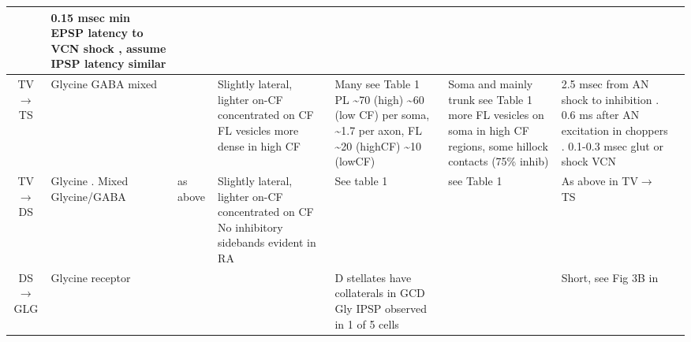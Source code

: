 \begin{longtable}{cXXXXXXX}
& 
0.15 msec min EPSP latency to VCN shock , assume IPSP latency similar
\citep{ZhangOertel:1993}\\ \midrule
TV\ensuremath{\rightarrow}TS                        
& %
Glycine\citep{OertelWickesberg:1993,OstapoffMorestEtAl:1999,SaintBensonEtAl:1991,WickesbergOertel:1993}
                GABA mixed \citep{OsenOttersenEtAl:1990}                  
& %
   \citep{HartyManis:1998,OertelWickesberg:1993,WickesbergOertel:1993}    
& %
Slightly lateral, lighter on-CF \citep{OstapoffMorestEtAl:1999} concentrated
on CF \citep{ZhangOertel:1993} FL vesicles more dense in high CF
                      \citep{JosephsonMorest:1998}                        
& %
Many \citep{OstapoffMorestEtAl:1999} see
Table 1 \citep{SmithRhode:1989} PL \~{}70 (high) \~{}60 (low CF) per soma,
\~{}1.7 per axon, FL \~{}20 (highCF) \~{}10 (lowCF)
                      \citep{JosephsonMorest:1998}                        
& %
Soma and mainly trunk
\citep{AltschulerJuizEtAl:1993} 
see Table 1\citep{SmithRhode:1989} 
more FL vesicles on soma in high CF regions, some hillock contacts (75\% inhib) \citep{JosephsonMorest:1998}                        
& %
2.5 msec from AN shock to inhibition \citep{WickesbergOertel:1993}. 
0.6 ms after AN excitation in choppers \citep{Wickesberg:1996}. 
0.1-0.3 msec glut or shock VCN \citep{ZhangOertel:1993}
\\ \midrule
TV\ensuremath{\rightarrow}DS                        
&  %
Glycine \citep{OstapoffMorestEtAl:1999,SaintBensonEtAl:1991}. 
Mixed  Glycine/GABA \citep{OsenOttersenEtAl:1990}                 
& %
\citep{OstapoffMorestEtAl:1999}
                                as above                                  
& Slightly lateral, lighter on-CF \citep{OstapoffMorestEtAl:1999}
concentrated on CF \citep{ZhangOertel:1993} No inhibitory sidebands evident in RA                                   
&    See table 1 \citep{SmithRhode:1989}     
& see Table 1 \citep{SmithRhode:1989}                          
& 
As above in TV\ensuremath{\rightarrow}TS
\\ \midrule
DS\ensuremath{\rightarrow}GLG                                 
&                  
Glycine receptor                  
&  %
& 
& D stellates have collaterals in GCD \citep[mouse][]{OertelWuEtAl:1990}
Gly IPSP observed in 1 of 5 cells \citep{FerragamoGoldingEtAl:1998}    
&                                            
& %
Short, see Fig 3B in \citep{FerragamoGoldingEtAl:1998}\\ \midrule


\end{longtable}
